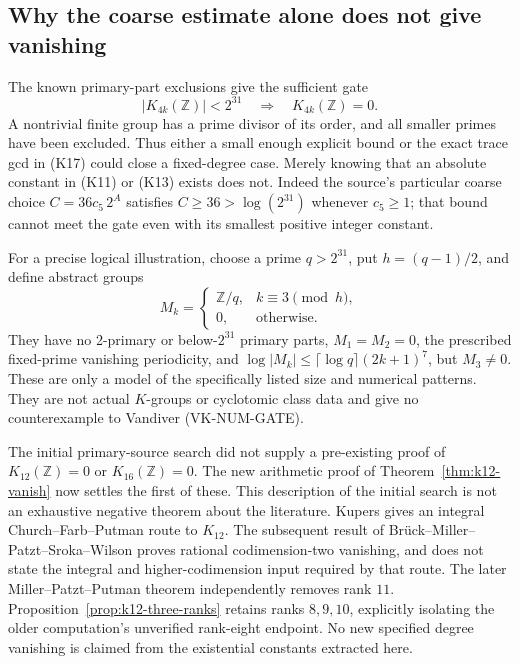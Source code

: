\documentclass[11pt,a4paper]{article}
\theoremstyle{definition}
\begin{document}
\subsection{Why the coarse estimate alone does not give vanishing}

The known primary-part exclusions give the sufficient gate
\[
 |K_{4k}(\mathbb Z)|<2^{31}
 \quad\Longrightarrow\quad K_{4k}(\mathbb Z)=0.       \tag{K22}
\]
A nontrivial finite group has a prime divisor of its order,
and all smaller primes have been excluded. Thus either a
small enough explicit bound or the exact trace gcd in
(K17) could close a fixed-degree case. Merely knowing that
an absolute constant in (K11) or (K13) exists does not.
Indeed the source's particular coarse choice
\(C=36c_5\,2^A\) satisfies \(C\ge36>\log(2^{31})\)
whenever \(c_5\ge1\); that bound cannot meet the gate even
with its smallest positive integer constant.

For a precise logical illustration, choose a prime
\(q>2^{31}\), put \(h=(q-1)/2\), and define abstract groups
\[
 M_k=
 \begin{cases}
 \mathbb Z/q,& k\equiv3\pmod h,\\
 0,&\text{otherwise}.
 \end{cases}
\]
They have no 2-primary or below-\(2^{31}\) primary parts,
\(M_1=M_2=0\), the prescribed fixed-prime vanishing
periodicity, and
\(\log|M_k|\le\lceil\log q\rceil(2k+1)^7\), but
\(M_3\ne0\). These are only a model of the specifically
listed size and numerical patterns. They are not actual
\(K\)-groups or cyclotomic class data and give no
counterexample to Vandiver (VK-NUM-GATE).

The initial primary-source search did not supply a pre-existing proof
of \(K_{12}(\mathbb Z)=0\) or \(K_{16}(\mathbb Z)=0\).
The new arithmetic proof of Theorem~\ref{thm:k12-vanish} now settles the
first of these. This description of the initial search is not an
exhaustive negative theorem about the literature.
Kupers \cite[Remark~2.6, p.~4]{Kupers2019} gives an
integral Church--Farb--Putman route to \(K_{12}\).
The subsequent result of Br\"uck--Miller--Patzt--Sroka--Wilson
\cite[Theorem~B]{BrueckEtAl2024} proves rational
codimension-two vanishing, and does not state the integral
and higher-codimension input required by that route.
The later Miller--Patzt--Putman theorem independently removes rank $11$.
Proposition~\ref{prop:k12-three-ranks} retains ranks $8,9,10$, explicitly
isolating the older computation's unverified rank-eight endpoint.
No new specified degree vanishing is claimed from the
existential constants extracted here.
\end{document}
